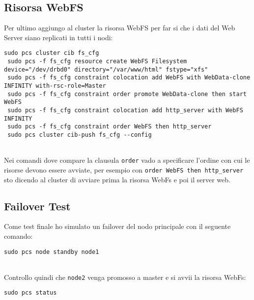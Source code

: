 \subsection{Risorsa WebFS}

Per ultimo aggiungo al cluster la risorsa WebFS per far si che i dati del Web Server siano replicati in tutti i nodi:

\begin{lstlisting}[style=cmd]
 sudo pcs cluster cib fs_cfg
 sudo pcs -f fs_cfg resource create WebFS Filesystem device="/dev/drbd0" directory="/var/www/html" fstype="xfs"
 sudo pcs -f fs_cfg constraint colocation add WebFS with WebData-clone INFINITY with-rsc-role=Master
 sudo pcs -f fs_cfg constraint order promote WebData-clone then start WebFS
 sudo pcs -f fs_cfg constraint colocation add http_server with WebFS INFINITY
 sudo pcs -f fs_cfg constraint order WebFS then http_server
 sudo pcs cluster cib-push fs_cfg --config
\end{lstlisting}
\ \\
Nei comandi dove compare la clausula \lstinline[style=cmd]|order| vado a specificare l'ordine con cui le risorse devono essere avviate, per esempio con \lstinline[style=cmd]|order WebFS then http_server| sto dicendo al cluster di avviare prima la risorsa WebFs e poi il server web.
\pagebreak
\subsection{Failover Test}

Come test finale ho simulato un failover del nodo principale con il seguente comando:

\begin{lstlisting}[style=cmd]
 sudo pcs node standby node1
\end{lstlisting}
\ \\
Controllo quindi che \lstinline[style=cmd]|node2| venga promosso a master e si avvii la risorsa WebFs:

\begin{lstlisting}[style=cmd]
 sudo pcs status
\end{lstlisting}

